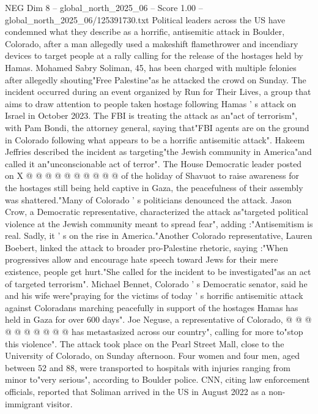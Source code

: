 \begin{textsample}{NEG Dim 8 – global\_north\_2025\_06 – Score 1.00 – global\_north\_2025\_06/125391730.txt}  \label{ex:f8_neg_407}
Political leaders across the US have condemned what they describe as a horrific, antisemitic attack in Boulder, Colorado, after a man allegedly used a makeshift flamethrower and incendiary devices to target people at a rally calling for the release of the hostages held by Hamas.
Mohamed Sabry Soliman, 45, has been charged with multiple felonies after allegedly shouting"Free Palestine"as he attacked the crowd on Sunday.
The incident occurred during an event organized by Run for Their Lives, a group that aims to draw attention to people taken hostage following Hamas ' s attack on Israel in October 2023.
The FBI is treating the attack as an"act of terrorism", with Pam Bondi, the attorney general, saying that"FBI agents are on the ground in Colorado following what appears to be a horrific antisemitic attack".
Hakeem Jeffries described the incident as targeting"the Jewish community in America"and called it an"unconscionable act of terror".
The House Democratic leader posted on X @ @ @ @ @ @ @ @ @ @ of the holiday of Shavuot to raise awareness for the hostages still being held captive in Gaza, the peacefulness of their assembly was shattered."Many of Colorado ' s politicians denounced the attack.
Jason Crow, a Democratic representative, characterized the attack as"targeted political violence at the Jewish community meant to spread fear", adding :"Antisemitism is real.
Sadly, it ' s on the rise in America."Another Colorado representative, Lauren Boebert, linked the attack to broader pro-Palestine rhetoric, saying :"When progressives allow and encourage hate speech toward Jews for their mere existence, people get hurt."She called for the incident to be investigated"as an act of targeted terrorism".
Michael Bennet, Colorado ' s Democratic senator, said he and his wife were"praying for the victims of today ' s horrific antisemitic attack against Coloradans marching peacefully in support of the hostages Hamas has held in Gaza for over 600 days".
Joe Neguse, a representative of Colorado, @ @ @ @ @ @ @ @ @ @ has metastasized across our country", calling for more to"stop this violence".
The attack took place on the Pearl Street Mall, close to the University of Colorado, on Sunday afternoon.
Four women and four men, aged between 52 and 88, were transported to hospitals with injuries ranging from minor to"very serious", according to Boulder police.
CNN, citing law enforcement officials, reported that Soliman arrived in the US in August 2022 as a non-immigrant visitor.

\end{textsample}

